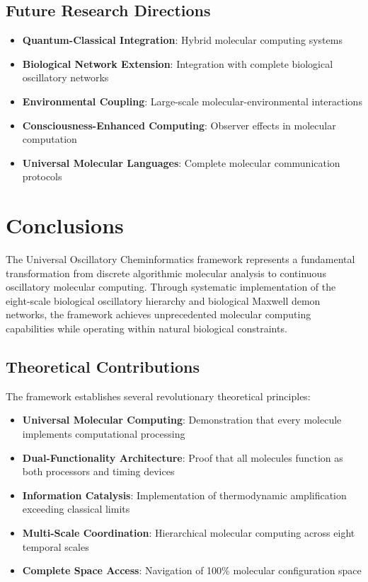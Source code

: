 \documentclass[12pt,a4paper]{article}
\begin{document}
\subsection{Future Research Directions}

\begin{itemize}
\item \textbf{Quantum-Classical Integration}: Hybrid molecular computing systems
\item \textbf{Biological Network Extension}: Integration with complete biological oscillatory networks
\item \textbf{Environmental Coupling}: Large-scale molecular-environmental interactions
\item \textbf{Consciousness-Enhanced Computing}: Observer effects in molecular computation
\item \textbf{Universal Molecular Languages}: Complete molecular communication protocols
\end{itemize}

\section{Conclusions}

The Universal Oscillatory Cheminformatics framework represents a fundamental transformation from discrete algorithmic molecular analysis to continuous oscillatory molecular computing. Through systematic implementation of the eight-scale biological oscillatory hierarchy and biological Maxwell demon networks, the framework achieves unprecedented molecular computing capabilities while operating within natural biological constraints.

\subsection{Theoretical Contributions}

The framework establishes several revolutionary theoretical principles:

\begin{itemize}
\item \textbf{Universal Molecular Computing}: Demonstration that every molecule implements computational processing
\item \textbf{Dual-Functionality Architecture}: Proof that all molecules function as both processors and timing devices
\item \textbf{Information Catalysis}: Implementation of thermodynamic amplification exceeding classical limits
\item \textbf{Multi-Scale Coordination}: Hierarchical molecular computing across eight temporal scales
\item \textbf{Complete Space Access}: Navigation of 100\% molecular configuration space
\end{itemize}
\end{document}
